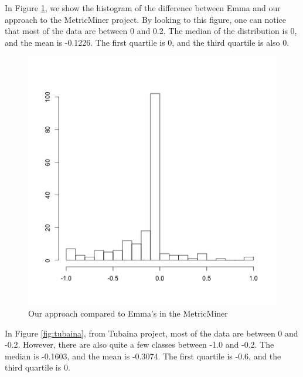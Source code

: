 \documentclass{sig-alternate}
\begin{document}
In Figure \ref{fig:metricminer}, we show the histogram of the difference between Emma and our approach to
the MetricMiner project. By looking to this figure, one can notice that most of the data are between 0 and 0.2. 
The median of the distribution is 0, and the mean is -0.1226. The first quartile is 0, and the
third quartile is also 0.

\begin{figure}[h!H]
  \centering
  \includegraphics[scale=0.4]{../stats/metricminer-histograma-gelato.png}

  \caption{Our approach compared to Emma's in the MetricMiner}
  \label{fig:metricminer}
\end{figure}

In Figure \ref{fig:tubaina}, from Tubaina project, most of the data are between
0 and -0.2. However, there are also quite a few classes between -1.0 and -0.2. 
The median is -0.1603, and the mean is -0.3074. The first quartile is
-0.6, and the third quartile is 0.
\end{document}
